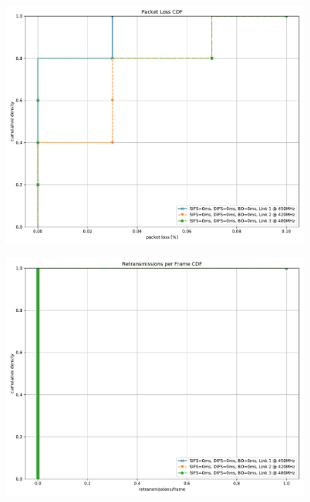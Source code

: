 \documentclass{article}
\begin{document}
\begin{figure}
	\includegraphics[width=\textwidth]{no_wait_single/cdf/packet_loss_cdf}
\end{figure}

\begin{figure}
	\includegraphics[width=\textwidth]{no_wait_single/cdf/retransmissions_per_frame_cdf}
\end{figure}
\end{document}
